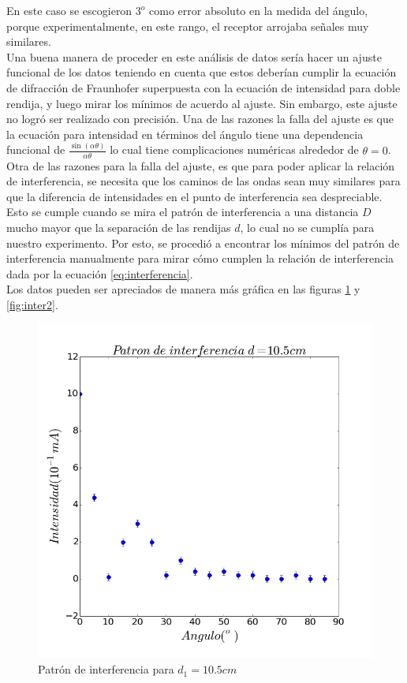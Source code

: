 \documentclass[%
 reprint,
 amsmath,amssymb,
 aps,
]{revtex4-1}
\begin{document}
En este caso se escogieron $3^o$ como error absoluto en la medida del ángulo, porque experimentalmente, en este rango, el receptor arrojaba señales muy similares.\\

Una buena manera de proceder en este análisis de datos sería hacer un ajuste funcional de los datos teniendo en cuenta que estos deberían cumplir la ecuación de difracción de Fraunhofer superpuesta con la ecuación de intensidad para doble rendija, y luego mirar los mínimos de acuerdo al ajuste. Sin embargo, este ajuste no logró ser realizado con precisión. Una de las razones la falla del ajuste es que la ecuación para intensidad en términos del ángulo tiene una dependencia funcional de $\frac{\sin{(\alpha \theta)}}{\alpha\theta}$ lo cual tiene complicaciones numéricas alrededor de $\theta= 0$. Otra de las razones para la falla del ajuste, es que para poder aplicar la relación de interferencia, se necesita que los caminos de las ondas sean muy similares para que la diferencia de intensidades en el punto de interferencia sea despreciable. Esto se cumple cuando se mira el patrón de interferencia a una distancia $D$ mucho mayor que la separación de las rendijas $d$, lo cual no se cumplía para nuestro experimento. Por esto, se procedió a encontrar los mínimos del patrón de interferencia manualmente para mirar cómo cumplen la relación de interferencia dada por la ecuación \ref{eq:interferencia}.\\

Los datos pueden ser apreciados de manera más gráfica en las figuras \ref{fig:inter1} y \ref{fig:inter2}.\\

\begin{figure}[h!]
\centering
\includegraphics[width=1\linewidth]{inter1}
\caption{Patrón de interferencia para $d_1 = 10.5cm$}
\label{fig:inter1}
\end{figure}
\end{document}
